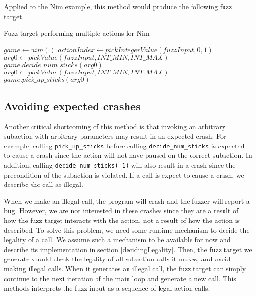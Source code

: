 Applied to the Nim example, this method would produce the following fuzz target.
\begin{algorithm}[H]
    \caption{Fuzz target performing multiple actions for Nim}
    \begin{algorithmic}[1]
    \STATE $game \gets nim()$
        \STATE $actionIndex \gets pickIntegerValue(fuzzInput, 0, 1)$
            \STATE $arg0 \gets pickValue(fuzzInput, INT\_MIN, INT\_MAX)$
            \STATE $game.decide\_num\_sticks(arg0)$
        \ENDIF
            \STATE $arg0 \gets pickValue(fuzzInput, INT\_MIN, INT\_MAX)$
            \STATE $game.pick\_up\_sticks(arg0)$
        \ENDIF
    \ENDWHILE
    \end{algorithmic}
\end{algorithm}

\subsection{Avoiding expected crashes}\label{avoidingCrashes}
Another critical shortcoming of this method is that invoking an arbitrary subaction with arbitrary parameters may result in an expected crash.
For example, calling \texttt{pick\_up\_sticks} before calling \texttt{decide\_num\_sticks} is expected to cause a crash since the action will not have paused on the correct subaction.
In addition, calling \texttt{decide\_num\_sticks(-1)} will also result in a crash since the precondition of the subaction is violated.
If a call is expect to cause a crash, we describe the call as illegal.

When we make an illegal call, the program will crash and the fuzzer will report a bug.
However, we are not interested in these crashes since they are a result of how the fuzz target interacts with the action, not a result of how the action is described.
To solve this problem, we need some runtime mechanism to decide the legality of a call.
We assume such a mechanism to be available for now and describe its implementation in section \ref{decidingLegality}.
Then, the fuzz target we generate should check the legality of all subaction calls it makes, and avoid making illegal calls.
When it generates an illegal call, the fuzz target can simply continue to the next iteration of the main loop and generate a new call.
This methods interprets the fuzz input as a sequence of legal action calls.


